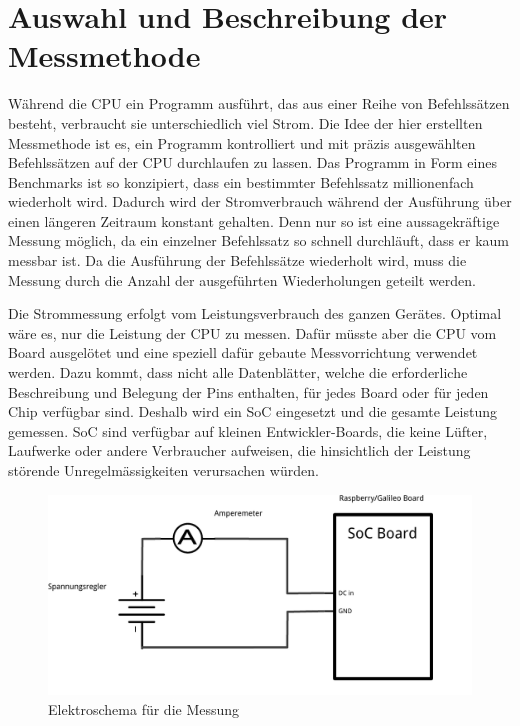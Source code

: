 \section{Auswahl und Beschreibung der Messmethode}
\label{chap:auswahl_beschreibung_methode}

Während die CPU ein Programm ausführt, das aus einer Reihe von Befehlssätzen besteht, verbraucht sie unterschiedlich viel Strom. Die Idee der hier erstellten Messmethode ist es, ein Programm kontrolliert und mit präzis ausgewählten Befehlssätzen auf der CPU durchlaufen zu lassen. Das Programm in Form eines Benchmarks ist so konzipiert, dass ein bestimmter Befehlssatz millionenfach wiederholt wird. Dadurch wird der Stromverbrauch während der Ausführung über einen längeren Zeitraum konstant gehalten. Denn nur so ist eine aussagekräftige Messung möglich, da ein einzelner Befehlssatz so schnell durchläuft, dass er kaum messbar ist. Da die Ausführung der Befehlssätze wiederholt wird, muss die Messung durch die Anzahl der ausgeführten Wiederholungen geteilt werden.
\par
Die Strommessung erfolgt vom Leistungsverbrauch des ganzen Gerätes. Optimal wäre es, nur die Leistung der CPU zu messen. Dafür müsste aber die CPU vom Board ausgelötet und eine speziell dafür gebaute Messvorrichtung verwendet werden. Dazu kommt, dass nicht alle Datenblätter, welche die erforderliche Beschreibung und Belegung der Pins enthalten, für jedes Board oder für jeden Chip verfügbar sind. Deshalb wird ein SoC eingesetzt und die gesamte Leistung gemessen. SoC sind verfügbar auf kleinen Entwickler-Boards, die keine Lüfter, Laufwerke oder andere Verbraucher aufweisen, die hinsichtlich der Leistung störende Unregelmässigkeiten verursachen würden.



\begin{figure}
\centering
\includegraphics[scale=0.5]{images/schema.pdf}
\caption{Elektroschema für die Messung}
\label{fig:Elektroschema}
\end{figure}


